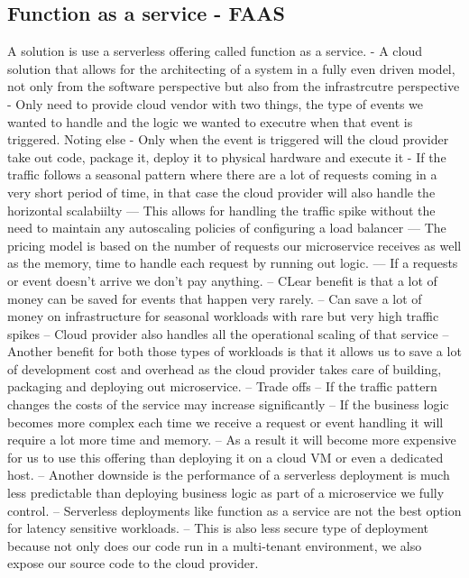 \documentclass[a4paper, 11pt]{book}
\begin{document}
    \subsection{Function as a service - FAAS}
    A solution is use a serverless offering called function as a service.
    - A cloud solution that allows for the architecting of a system in a fully even driven model, not only from the software perspective but also from the infrastrcutre perspective
    - Only need to provide cloud vendor with two things, the type of events we wanted to handle and the logic we wanted to executre when that event is triggered. Noting else
    - Only when the event is triggered will the cloud provider take out code, package it, deploy it to physical hardware and execute it
    - If the traffic follows a seasonal pattern where there are a lot of requests coming in a very short period of time, in that case the cloud provider will also handle the horizontal scalabiilty
    --- This allows for handling the traffic spike without the need to maintain any autoscaling policies of configuring a load balancer
    --- The pricing model is based on the number of requests our microservice receives as well as the memory, time to handle each request by running out logic.
    --- If a requests or event doesn't arrive we don't pay anything.
    -- CLear benefit is that a lot of money can be saved for events that happen very rarely.
    -- Can save a lot of money on infrastructure for seasonal workloads with rare but very high traffic spikes
    -- Cloud provider also handles all the operational scaling of that service
    -- Another benefit for both those types of workloads is that it allows us to save a lot of development cost and overhead as the cloud provider takes care of building, packaging and deploying out microservice.
    -- Trade offs
    -- If the traffic pattern changes the costs of the service may increase significantly
    -- If the business logic becomes more complex each time we receive a request or event handling it will require a lot more time and memory.
    -- As a result it will become more expensive for us to use this offering than deploying it on a cloud VM or even a dedicated host.
    -- Another downside is the performance of a serverless deployment is much less predictable than deploying business logic as part of a microservice we fully control.
    -- Serverless deployments like function as a service are not the best option for latency sensitive workloads.
    -- This is also less secure type of deployment because not only does our code run in a multi-tenant environment, we also expose our source code to the cloud provider.
\end{document}
